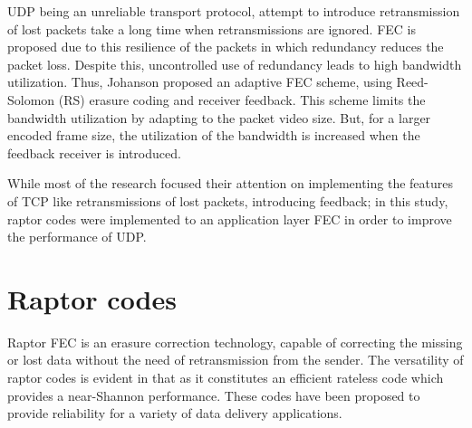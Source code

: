 \par
\par
\par
UDP being an unreliable transport protocol, attempt to introduce retransmission of lost packets take a long time when retransmissions are ignored. FEC is proposed due to this resilience of the packets in which redundancy reduces the packet loss. Despite this, uncontrolled use of redundancy leads to high bandwidth utilization. Thus, Johanson \cite{johanson2003adaptive} proposed an adaptive FEC scheme, using Reed-Solomon (RS) erasure coding and receiver feedback. This scheme limits the bandwidth utilization by adapting to the packet video size. But, for a larger encoded frame size, the utilization of the bandwidth is increased when the feedback receiver is introduced.
\par
While most of the research focused their attention on implementing the features of TCP like retransmissions of lost packets, introducing feedback; in this study, raptor codes were implemented to an application layer FEC in order to improve the performance of UDP.

\section{Raptor codes}

Raptor FEC is an erasure correction technology, capable of correcting the missing or lost data without the need of retransmission from the sender. The versatility of raptor codes is evident in that as it constitutes an efficient rateless code which provides a near-Shannon performance. These codes have been proposed to provide reliability for a variety of data delivery applications.

